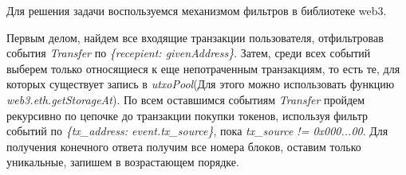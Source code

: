 \solutionSection

Для решения задачи воспользуемся механизмом фильтров в библиотеке web3.

Первым делом, найдем все входящие транзакции пользователя, отфильтровав события \textit{Transfer} по \textit{\{recepient: givenAddress\}}. Затем, среди всех событий выберем только относящиеся к еще непотраченным транзакциям, то есть те, для которых существует запись в \textit{utxoPool}(Для этого можно использовать функцию \textit{web3.eth.getStorageAt}). По всем оставшимся событиям \textit{Transfer} пройдем рекурсивно по цепочке до транзакции покупки токенов, используя фильтр событий по \textit{\{tx\_address: event.tx\_source\}}, пока \textit{tx\_source != 0x000...00}. Для получения конечного ответа получим все номера блоков, оставим только уникальные, запишем в возрастающем порядке.

\codeExample

